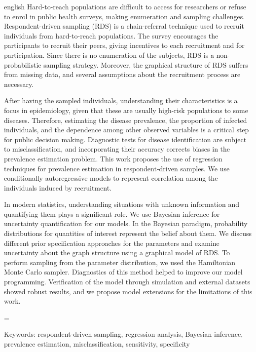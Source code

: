 \setlength{\absparsep}{18pt} 

\begin{resumo}[Abstract]
 \begin{otherlanguage*}{english}
    Hard-to-reach populations are difficult to access for researchers or refuse to enrol in public health surveys, making enumeration and sampling challenges. Respondent-driven sampling (RDS) is a chain-referral technique used to recruit individuals from hard-to-reach populations. The survey encourages the participants to recruit their peers, giving incentives to each recruitment and for participation. Since there is no enumeration of the subjects, RDS is a non-probabilistic sampling strategy. Moreover, the graphical structure of RDS suffers from missing data, and several assumptions about the recruitment process are necessary. 
    
    After having the sampled individuals, understanding their characteristics
    is a focus in epidemiology, given that these are usually high-risk
    populations to some diseases. Therefore, estimating the disease
    prevalence, the proportion of infected individuals, and the dependence
    among other observed variables is a critical step for public decision
    making. Diagnostic tests for disease identification are subject to
    misclassification, and incorporating their accuracy corrects biases in the
    prevalence estimation problem. This work proposes the use of regression
    techniques for prevalence estimation in respondent-driven samples. We use
    conditionally autoregressive models to represent correlation among the
    individuals induced by recruitment.
    
    In modern statistics, understanding situations with unknown information
    and quantifying them plays a significant role. We use Bayesian inference
    for uncertainty quantification for our models. In the Bayesian paradigm,
    probability distributions for quantities of interest represent the belief
    about them. We discuss different prior specification approaches for the
    parameters and examine uncertainty about the graph structure using a
    graphical model of RDS. To perform sampling from the parameter
    distribution, we used the Hamiltonian Monte Carlo sampler. Diagnostics of
    this method helped to improve our model programming. Verification of the
    model through simulation and external datasets showed robust results, and
    we propose model extensions for the limitations of this work.
 \end{otherlanguage*}=

 Keywords: respondent-driven sampling, regression analysis, Bayesian
 inference, prevalence estimation, misclassification, sensitivity, specificity
\end{resumo}

